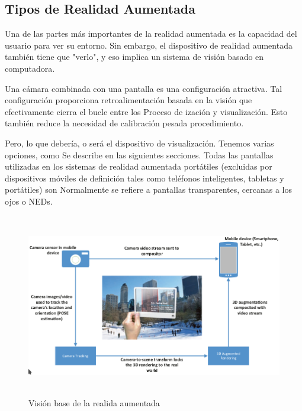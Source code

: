 \subsection{Tipos de Realidad Aumentada}
Una de las partes más importantes de la realidad aumentada es la capacidad del usuario para ver su entorno. Sin embargo, el dispositivo de realidad aumentada también tiene que "verlo", y eso implica un sistema de visión basado en computadora.\cite{BXX} \par
\vspace{5mm}
Una cámara combinada con una pantalla es una configuración atractiva. Tal configuración proporciona retroalimentación basada en la visión que efectivamente cierra el bucle entre los Proceso de ización y visualización. Esto también reduce la necesidad de calibración pesada procedimiento.\cite{BXX} \par
\vspace{5mm}
Pero, lo que debería, o será el dispositivo de visualización. Tenemos varias opciones, como Se describe en las siguientes secciones. Todas las pantallas utilizadas en los sistemas de realidad aumentada portátiles (excluidas por dispositivos móviles de definición tales como teléfonos inteligentes, tabletas y portátiles) son Normalmente se refiere a pantallas transparentes, cercanas a los ojos o NEDs.\cite{BXX} \par
\vspace{5mm}
\begin{figure}[h!]
	\centering
	\includegraphics[width=12cm,height=8cm]{imagenes/marcoteorico/ar/visionAR.png}
	\caption{Visión base de la realida aumentada\cite{BXX}}
	\label{fig:analogo}
\end{figure}
